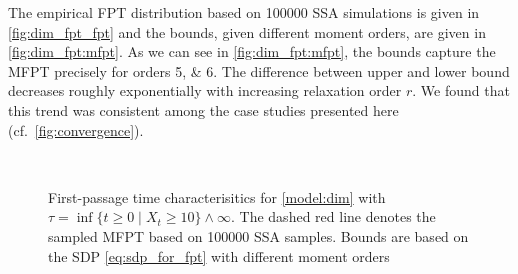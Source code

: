 The empirical \ac{FPT} distribution based on \num{100000} \ac{SSA}
simulations is given in \autoref{fig:dim_fpt_fpt}
and the bounds, given different moment orders, are given in
\autoref{fig:dim_fpt:mfpt}.
As we can see in \autoref{fig:dim_fpt:mfpt}, the bounds capture the
\ac{MFPT} precisely for orders \numlist{5;6}.
The difference between upper and lower bound decreases roughly
exponentially with increasing relaxation order $r$.
We found that this trend was consistent among the case studies
presented here (cf.\ \autoref{fig:convergence}).
\begin{figure}
  \centering
   \\
  \caption[\ac{FPT} and \ac{MFPT} distribution and
  bounds]{First-passage time characterisitics for \autoref{model:dim}
    with $\tau=\inf\{t\geq 0\mid X_t \geq 10\}\land \infty$.
    The dashed red line denotes the sampled \ac{MFPT} based on
    \num{100000} \ac{SSA} samples. Bounds are based on the \ac{SDP}
  \eqref{eq:sdp_for_fpt} with different moment orders}
\end{figure}

